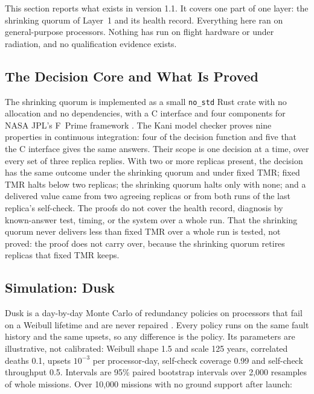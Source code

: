 \documentclass[10pt, a4paper]{article}
\begin{document}
This section reports what exists in version 1.1. It covers one part of one layer: the shrinking quorum of Layer~1 and its health record. Everything here ran on general-purpose processors. Nothing has run on flight hardware or under radiation, and no qualification evidence exists.

\subsection{The Decision Core and What Is Proved}

The shrinking quorum is implemented as a small \texttt{no\_std} Rust crate with no allocation and no dependencies, with a C interface and four components for NASA JPL's F~Prime framework \cite{flight2026}. The Kani model checker \cite{kani2024} proves nine properties in continuous integration: four of the decision function and five that the C interface gives the same answers. Their scope is one decision at a time, over every set of three replica replies. With two or more replicas present, the decision has the same outcome under the shrinking quorum and under fixed TMR; fixed TMR halts below two replicas; the shrinking quorum halts only with none; and a delivered value came from two agreeing replicas or from both runs of the last replica's self-check. The proofs do not cover the health record, diagnosis by known-answer test, timing, or the system over a whole run. That the shrinking quorum never delivers less than fixed TMR over a whole run is tested, not proved: the proof does not carry over, because the shrinking quorum retires replicas that fixed TMR keeps.

\subsection{Simulation: Dusk}

Dusk is a day-by-day Monte Carlo of redundancy policies on processors that fail on a Weibull lifetime and are never repaired \cite{dusk2026}. Every policy runs on the same fault history and the same upsets, so any difference is the policy. Its parameters are illustrative, not calibrated: Weibull shape 1.5 and scale 125 years, correlated deaths 0.1, upsets $10^{-3}$ per processor-day, self-check coverage 0.99 and self-check throughput 0.5. Intervals are 95\% paired bootstrap intervals over 2{,}000 resamples of whole missions. Over 10{,}000 missions with no ground support after launch:
\end{document}
